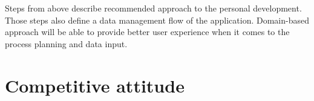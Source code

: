 Steps from above describe recommended approach to the personal development.
Those steps also define a data management flow of the application.
Domain-based approach will be able to provide better user experience when it comes to the process planning and data input.



\section{Competitive attitude}\label{sec:competitive-attitude}




